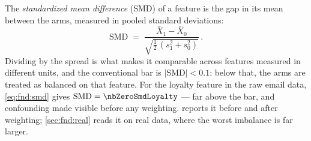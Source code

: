 The \emph{standardized mean difference} (SMD) of a feature is the gap in its mean between the arms,
measured in pooled standard deviations:
%
\begin{equation}
  \text{SMD} \;=\;
  \frac{\bar X_1 - \bar X_0}{\sqrt{\tfrac12\,(s_1^{2} + s_0^{2})}}\,.
  \label{eq:fnd:smd}
\end{equation}
%
Dividing by the spread is what makes it comparable across features measured in different units,
and the conventional bar is $|\text{SMD}| < 0.1$: below that, the arms are treated as balanced on
that feature. For the loyalty feature in the raw email data, \cref{eq:fnd:smd} gives
$\text{SMD} = \nbZeroSmdLoyalty$ --- far above the bar, and confounding made visible before any
weighting.  reports it before and after weighting; \cref{sec:fnd:real} reads
it on real data, where the worst imbalance is far larger.

